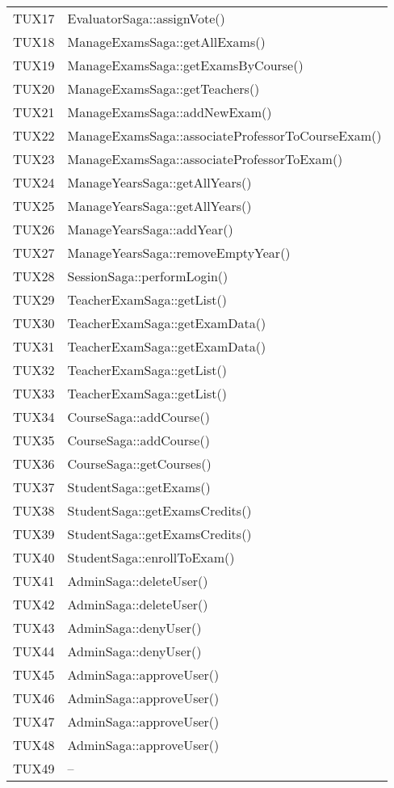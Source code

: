 \documentclass[PianoDiQualifica.tex]{subfiles}
\begin{document}
\begin{longtable}[H]{P{5cm}P{9cm}}
	TUX17 & EvaluatorSaga::assignVote() \\
	TUX18 & ManageExamsSaga::getAllExams() \\
	TUX19 & ManageExamsSaga::getExamsByCourse() \\
	TUX20 & ManageExamsSaga::getTeachers() \\
	TUX21 & ManageExamsSaga::addNewExam() \\
	TUX22 & ManageExamsSaga::associateProfessorToCourseExam() \\
	TUX23 & ManageExamsSaga::associateProfessorToExam() \\
	TUX24 & ManageYearsSaga::getAllYears() \\
	TUX25 & ManageYearsSaga::getAllYears() \\
	TUX26 & ManageYearsSaga::addYear() \\
	TUX27 & ManageYearsSaga::removeEmptyYear() \\
	TUX28 & SessionSaga::performLogin() \\
	TUX29 & TeacherExamSaga::getList() \\
	TUX30 & TeacherExamSaga::getExamData() \\
	TUX31 & TeacherExamSaga::getExamData() \\
	TUX32 & TeacherExamSaga::getList() \\
	TUX33 & TeacherExamSaga::getList() \\
	TUX34 & CourseSaga::addCourse() \\
	TUX35 & CourseSaga::addCourse() \\
	TUX36 & CourseSaga::getCourses() \\
	TUX37 & StudentSaga::getExams() \\
	TUX38 & StudentSaga::getExamsCredits() \\
	TUX39 & StudentSaga::getExamsCredits() \\
	TUX40 & StudentSaga::enrollToExam() \\
	TUX41 & AdminSaga::deleteUser() \\
	TUX42 & AdminSaga::deleteUser() \\
	TUX43 & AdminSaga::denyUser() \\
	TUX44 & AdminSaga::denyUser() \\
	TUX45 & AdminSaga::approveUser() \\
	TUX46 & AdminSaga::approveUser() \\
	TUX47 & AdminSaga::approveUser() \\
	TUX48 & AdminSaga::approveUser() \\
	TUX49 & -- \\

\end{longtable}
\end{document}
